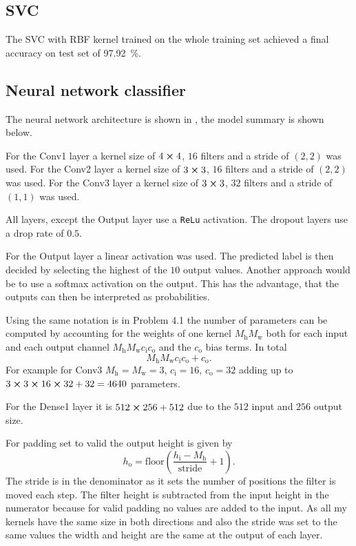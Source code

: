 \documentclass[12pt,a4paper]{scrartcl}
\begin{document}
	\subsection*{SVC}
	
	The SVC with RBF kernel trained on the whole training set achieved a final accuracy on test set of \SI{97.92}{\percent}.
	
	\subsection*{Neural network classifier}
	
	The neural network architecture is shown in , the model summary is shown below.
	
	For the Conv1 layer a kernel size of $4\cross4$, $16$ filters and a stride of $(2,2)$ was used.
	For the Conv2 layer a kernel size of $3\cross3$, $16$ filters and a stride of $(2,2)$ was used.
	For the Conv3 layer a kernel size of $3\cross3$, $32$ filters and a stride of $(1,1)$ was used. 
	
	All layers, except the Output layer use a \texttt{ReLu} activation.
	The dropout layers use a drop rate of $0.5$.
	
	For the Output layer a linear activation was used. The predicted label is then decided by selecting the highest of the $10$ output values. Another approach would be to use a softmax activation on the output. This has the advantage, that the outputs can then be interpreted as probabilities.
	
	Using the same notation is in Problem 4.1 the number of parameters can be computed by accounting for the weights of one kernel $M_\mathrm{h} M_\mathrm{w}$ both for each input and each output channel $M_\mathrm{h} M_\mathrm{w} c_\mathrm{i} c_\mathrm{o}$ and the $c_\mathrm{o}$ bias terms.
	In total 
	\begin{equation}
		M_\mathrm{h} M_\mathrm{w} c_\mathrm{i} c_\mathrm{o} + c_\mathrm{o}.
	\end{equation}
	For example for Conv3 $M_\mathrm{h}=M_\mathrm{w}=3$, $c_\mathrm{i}=16$, $c_\mathrm{o}=32$ adding up to $3\cross3\cross16\cross32+32=4640$ parameters.
	
	For the Dense1 layer it is $512\cross256+512$ due to the $512$ input and $256$ output size.
	
	For padding set to valid the output height is given by
	\begin{equation}
		h_\mathrm{o} = \mathrm{floor}\left( \frac{h_\mathrm{i}-M_\mathrm{h}}{\mathrm{stride}}+1 \right).
	\end{equation}
	The stride is in the denominator as it sets the number of positions the filter is moved each step. The filter height is subtracted from the input height in the numerator because for valid padding no values are added to the input.
	As all my kernels have the same size in both directions and also the stride was set to the same values the width and height are the same at the output of each layer.
	
\end{document}

